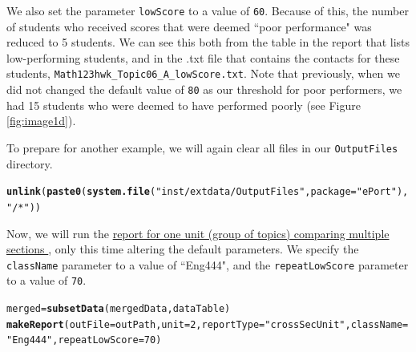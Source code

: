 \documentclass{article}\usepackage[]{graphicx}\usepackage[]{color}
\makeatletter
\newcommand{\hlnum}[1]{\textcolor[rgb]{0.686,0.059,0.569}{#1}}%
\newcommand{\hlstr}[1]{\textcolor[rgb]{0.192,0.494,0.8}{#1}}%
\newcommand{\hlstd}[1]{\textcolor[rgb]{0.345,0.345,0.345}{#1}}%
\newcommand{\hlkwb}[1]{\textcolor[rgb]{0.69,0.353,0.396}{#1}}%
\newcommand{\hlkwc}[1]{\textcolor[rgb]{0.333,0.667,0.333}{#1}}%
\newcommand{\hlkwd}[1]{\textcolor[rgb]{0.737,0.353,0.396}{\textbf{#1}}}%
\newenvironment{kframe}{%
 \def\at@end@of@kframe{}%
 \ifinner\ifhmode%
  \def\at@end@of@kframe{\end{minipage}}%
  \begin{minipage}{\columnwidth}%
 \fi\fi%
 \def\FrameCommand##1{\hskip\@totalleftmargin \hskip-\fboxsep
 \colorbox{shadecolor}{##1}\hskip-\fboxsep
     \hskip-\linewidth \hskip-\@totalleftmargin \hskip\columnwidth}%
 \MakeFramed {\advance\hsize-\width
   \@totalleftmargin\z@ \linewidth\hsize
   \@setminipage}}%
 {\par\unskip\endMakeFramed%
 \at@end@of@kframe}
\newenvironment{knitrout}{}{} %
\numberwithin{equation}{section} %
\makeatother
\begin{document}
We also set the parameter \texttt{lowScore} to a value of \texttt{60}. Because of this, the number of students who received scores that were deemed ``poor performance" was reduced to 5 students. We can see this both from the table in the report that lists low-performing students, and in the .txt file that contains the contacts for these students, \texttt{Math123hwk\_Topic06\_A\_lowScore.txt}. Note that previously, when we did not changed the default value of \texttt{80} as our threshold for poor performers, we had 15 students who were deemed to have performed poorly (see Figure \ref{fig:image1d}).

To prepare for another example, we will again clear all files in our \texttt{OutputFiles} directory. \\

\begin{knitrout}
\color{fgcolor}\begin{kframe}
\begin{alltt}
\hlkwd{unlink}\hlstd{(}\hlkwd{paste0}\hlstd{(}\hlkwd{system.file}\hlstd{(}\hlstr{"inst/extdata/OutputFiles"}\hlstd{,} \hlkwc{package} \hlstd{=} \hlstr{"ePort"}\hlstd{),} \hlstr{"/*"}\hlstd{))}
\end{alltt}
\end{kframe}
\end{knitrout}

Now, we will run the \hyperref[sec:crossSecU]{report for one unit (group of topics) comparing multiple sections }, only this time altering the default parameters. We specify the \texttt{className} parameter to a value of ``Eng444", and the \texttt{repeatLowScore} parameter to a value of \texttt{70}. \\

\begin{knitrout}
\color{fgcolor}\begin{kframe}
\begin{alltt}
\hlstd{merged} \hlkwb{=} \hlkwd{subsetData}\hlstd{(mergedData, dataTable)}
\hlkwd{makeReport}\hlstd{(}\hlkwc{outFile} \hlstd{= outPath,} \hlkwc{unit} \hlstd{=} \hlnum{2}\hlstd{,} \hlkwc{reportType} \hlstd{=} \hlstr{"crossSecUnit"}\hlstd{,} \hlkwc{className} \hlstd{=}
  \hlstr{"Eng444"}\hlstd{,} \hlkwc{repeatLowScore} \hlstd{=} \hlnum{70}\hlstd{)}
\end{alltt}
\end{kframe}
\end{knitrout}
\end{document}
